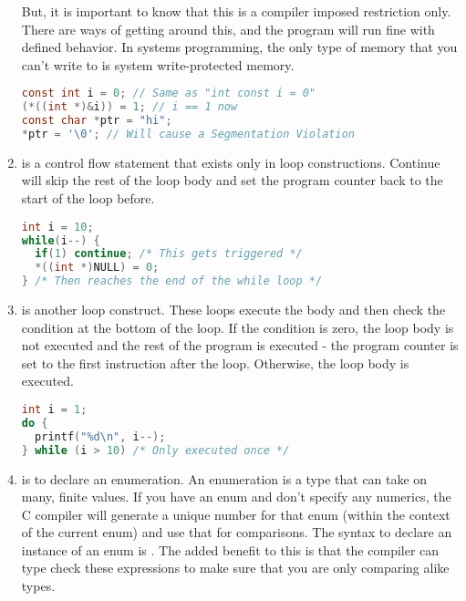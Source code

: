 \begin{enumerate}
	      But, it is important to know that this is a compiler imposed restriction only.
        There are ways of getting around this, and the program will run fine with defined behavior.
        In systems programming, the only type of memory that you can't write to is system write-protected memory.

\begin{lstlisting}[language=C]
const int i = 0; // Same as "int const i = 0"
(*((int *)&i)) = 1; // i == 1 now
const char *ptr = "hi";
*ptr = '\0'; // Will cause a Segmentation Violation
\end{lstlisting}

	    \item {} is a control flow statement that exists only in loop constructions.
        Continue will skip the rest of the loop body and set the program counter back to the start of the loop before.

\begin{lstlisting}[language=C]
int i = 10;
while(i--) {
  if(1) continue; /* This gets triggered */
  *((int *)NULL) = 0;
} /* Then reaches the end of the while loop */
\end{lstlisting}

	    \item {} is another loop construct.
        These loops execute the body and then check the condition at the bottom of the loop.
        If the condition is zero, the loop body is not executed and the rest of the program is executed - the program counter is set to the first instruction after the loop.
        Otherwise, the loop body is executed.

\begin{lstlisting}[language=C]
int i = 1;
do {
  printf("%d\n", i--);
} while (i > 10) /* Only executed once */
\end{lstlisting}

	    \item {} is to declare an enumeration.
        An enumeration is a type that can take on many, finite values.
        If you have an enum and don't specify any numerics, the C compiler will generate a unique number for that enum (within the context of the current enum) and use that for comparisons.
        The syntax to declare an instance of an enum is .
        The added benefit to this is that the compiler can type check these expressions to make sure that you are only comparing alike types.


\end{enumerate}
